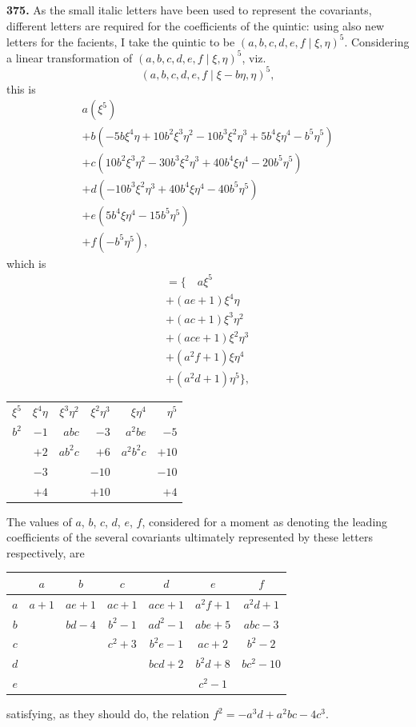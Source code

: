 \documentclass[11pt,a4paper]{book}
\begin{document}
\noindent\textbf{375.} As the small italic letters have been used to represent the covariants, different letters are required for the coefficients of the quintic: using also new letters for the facients, I take the quintic to be $(a, b, c, d, e, f \mid \xi, \eta)^5$. Considering a linear transformation of $(a, b, c, d, e, f \mid \xi, \eta)^5$, viz.
\[
(a, b, c, d, e, f \mid \xi - b\eta, \eta)^5,
\]
this is
\begin{multline*}
a(\xi^5) \\
+ b(-5b\xi^4\eta + 10b^2\xi^3\eta^2 - 10b^3\xi^2\eta^3 + 5b^4\xi\eta^4 - b^5\eta^5) \\
+ c(10b^2\xi^3\eta^2 - 30b^3\xi^2\eta^3 + 40b^4\xi\eta^4 - 20b^5\eta^5) \\
+ d(-10b^3\xi^2\eta^3 + 40b^4\xi\eta^4 - 40b^5\eta^5) \\
+ e(5b^4\xi\eta^4 - 15b^5\eta^5) \\
+ f(-b^5\eta^5),
\end{multline*}
which is
\begin{multline*}
= \{\quad a\xi^5 \\
+ (ae + 1)\xi^4\eta \\
+ (ac + 1)\xi^3\eta^2 \\
+ (ace + 1)\xi^2\eta^3 \\
+ (a^2 f + 1)\xi\eta^4 \\
+ (a^2 d + 1)\eta^5\},
\end{multline*}
\begin{center}
\begin{tabular}{r@{\quad}r@{\quad}r@{\quad}r@{\quad}r@{\quad}r}
$\xi^5$ & $\xi^4\eta$ & $\xi^3\eta^2$ & $\xi^2\eta^3$ & $\xi\eta^4$ & $\eta^5$ \\[2pt]
$b^2$ & $-1$ & $abc$ & $-3$ & $a^2 be$ & $-5$ \\
& $+2$ & $ab^2 c$ & $+6$ & $a^2 b^2 c$ & $+10$ \\
& $-3$ & & $-10$ & & $-10$ \\
& $+4$ & & $+10$ & & $+4$
\end{tabular}
\end{center}

The values of $a$, $b$, $c$, $d$, $e$, $f$, considered for a moment as denoting the leading coefficients of the several covariants ultimately represented by these letters respectively, are
\begin{center}
\begin{tabular}{c|cccccc}
& $a$ & $b$ & $c$ & $d$ & $e$ & $f$ \\[2pt]
\hline
$a$ & $a+1$ & $ae+1$ & $ac+1$ & $ace+1$ & $a^2 f+1$ & $a^2 d+1$ \\
$b$ & & $bd-4$ & $b^2-1$ & $ad^2-1$ & $abe+5$ & $abc-3$ \\
$c$ & & & $c^2+3$ & $b^2 e-1$ & $ac+2$ & $b^2-2$ \\
$d$ & & & & $bcd+2$ & $b^2 d+8$ & $bc^2-10$ \\
$e$ & & & & & $c^2-1$ &
\end{tabular}
\end{center}
satisfying, as they should do, the relation $f^2 = -a^3 d + a^2 bc - 4c^3$.
\end{document}
